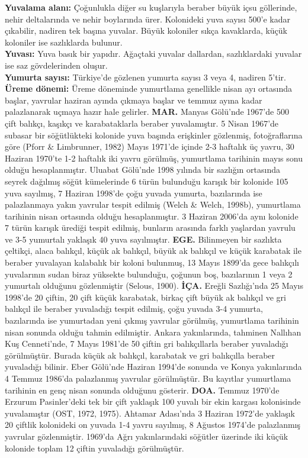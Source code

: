 \documentclass[
  a4paper,
  DIV=11,
  numbers=noendperiod]{scrreprt}
\begin{document}
\textbf{Yuvalama alanı:} Çoğunlukla diğer su kuşlarıyla beraber büyük
içsu göllerinde, nehir deltalarında ve nehir boylarında ürer. Kolonideki
yuva sayısı 500'e kadar çıkabilir, nadiren tek başına yuvalar. Büyük
koloniler sıkça kavaklarda, küçük koloniler ise sazlıklarda bulunur.\\
\textbf{Yuvası:} Yuva basık bir yapıdır. Ağaçtaki yuvalar dallardan,
sazlıklardaki yuvalar ise saz gövdelerinden oluşur.\\
\textbf{Yumurta sayısı:} Türkiye'de gözlenen yumurta sayısı 3 veya 4,
nadiren 5'tir.\\
\textbf{Üreme dönemi:} Üreme döneminde yumurtlama genellikle nisan ayı
ortasında başlar, yavrular haziran ayında çıkmaya başlar ve temmuz ayına
kadar palazlanarak uçmaya hazır hale gelirler. \textbf{MAR.} Manyas
Gölü'nde 1967'de 500 çift balıkçı, kaşıkçı ve karabataklarla beraber
yuvalamıştır. 5 Nisan 1967'de subasar bir söğütlükteki kolonide yuva
başında erişkinler gözlenmiş, fotoğraflarına göre (Pforr \& Limbrunner,
1982) Mayıs 1971'de içinde 2-3 haftalık üç yavru, 30 Haziran 1970'te 1-2
haftalık iki yavru görülmüş, yumurtlama tarihinin mayıs sonu olduğu
hesaplanmıştır. Uluabat Gölü'nde 1998 yılında bir sazlığın ortasında
seyrek dağılmış söğüt kümelerinde 6 türün bulunduğu karışık bir kolonide
105 yuva sayılmış, 7 Haziran 1998'de çoğu yuvada yumurta, bazılarında
ise palazlanmaya yakın yavrular tespit edilmiş (Welch \& Welch, 1998b),
yumurtlama tarihinin nisan ortasında olduğu hesaplanmıştır. 3 Haziran
2006'da aynı kolonide 7 türün karışık ürediği tespit edilmiş, bunların
arasında farklı yaşlardan yavrulu ve 3-5 yumurtalı yaklaşık 40 yuva
sayılmıştır. \textbf{EGE.} Bilinmeyen bir sazlıkta çeltikçi, alaca
balıkçıl, küçük ak balıkçıl, büyük ak balıkçıl ve küçük karabatak ile
beraber yuvalayan kalabalık bir koloni bulunmuş, 13 Mayıs 1899'da gece
balıkçılı yuvalarının sudan biraz yüksekte bulunduğu, çoğunun boş,
bazılarının 1 veya 2 yumurtalı olduğunu gözlenmiştir (Selous, 1900).
\textbf{İÇA.} Ereğli Sazlığı'nda 25 Mayıs 1998'de 20 çiftin, 20 çift
küçük karabatak, birkaç çift büyük ak balıkçıl ve gri balıkçıl ile
beraber yuvaladığı tespit edilmiş, çoğu yuvada 3-4 yumurta, bazılarında
ise yumurtadan yeni çıkmış yavrular görülmüş, yumurtlama tarihinin nisan
sonunda olduğu tahmin edilmiştir. Ankara yakınlarında, tahminen Nallıhan
Kuş Cenneti'nde, 7 Mayıs 1981'de 50 çiftin gri balıkçıllarla beraber
yuvaladığı görülmüştür. Burada küçük ak balıkçıl, karabatak ve gri
balıkçılla beraber yuvaladığı bilinir. Eber Gölü'nde Haziran 1994'de
sonunda ve Konya yakınlarında 4 Temmuz 1986'da palazlanmış yavrular
görülmüştür. Bu kayıtlar yumurtlama tarihinin en genç nisan sonunda
olduğunu gösterir. \textbf{DOA.} Temmuz 1970'de Erzurum Pasinler'deki
tek bir çift yaklaşık 100 yuvalı bir ekin kargası kolonisinde
yuvalamıştır (OST, 1972, 1975). Ahtamar Adası'nda 3 Haziran 1972'de
yaklaşık 20 çiftlik kolonideki on yuvada 1-4 yavru sayılmış, 8 Ağustos
1974'de palazlanmış yavrular gözlenmiştir. 1969'da Ağrı yakınlarındaki
söğütler üzerinde iki küçük kolonide toplam 12 çiftin yuvaladığı
görülmüştür.
\end{document}
